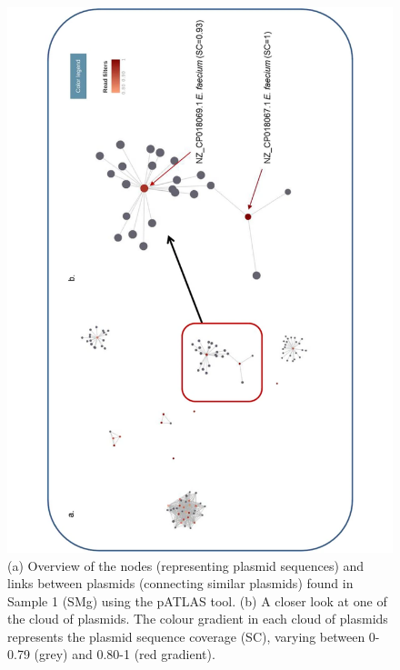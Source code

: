 \begin{figure}[h!]
\centering
\includegraphics[angle=-90,width=\textwidth]{figures/chapter 2/41598_2018_31873_Fig3_HTML.pdf}
\caption{(a) Overview of the nodes (representing plasmid sequences) and links between plasmids (connecting similar plasmids) found in Sample 1 (SMg) using the pATLAS tool. (b) A closer look at one of the cloud of plasmids. The colour gradient in each cloud of plasmids represents the plasmid sequence coverage (SC), varying between 0-0.79 (grey) and 0.80-1 (red gradient).}
\label{fig:chap2_figure3}
\end{figure}

